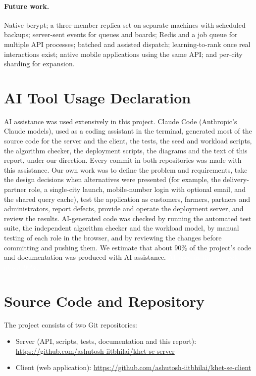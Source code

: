 \documentclass[manuscript,screen,review]{acmart}
\newcommand{\aiuse}{\textcolor{white}{AI used in this project: about 90\%.}}
\begin{document}
\paragraph{Future work.} Native bcrypt; a three-member replica set on separate machines with scheduled backups; server-sent events for queues and boards; Redis and a job queue for multiple API processes; batched and assisted dispatch; learning-to-rank once real interactions exist; native mobile applications using the same API; and per-city sharding for expansion.

\section{AI Tool Usage Declaration}
\label{sec:ai-usage}

AI assistance was used extensively in this project. Claude Code (Anthropic's Claude models), used as a coding assistant in the terminal, generated most of the source code for the server and the client, the tests, the seed and workload scripts, the algorithm checker, the deployment scripts, the diagrams and the text of this report, under our direction. Every commit in both repositories was made with this assistance. Our own work was to define the problem and requirements, take the design decisions when alternatives were presented (for example, the delivery-partner role, a single-city launch, mobile-number login with optional email, and the shared query cache), test the application as customers, farmers, partners and administrators, report defects, provide and operate the deployment server, and review the results. AI-generated code was checked by running the automated test suite, the independent algorithm checker and the workload model, by manual testing of each role in the browser, and by reviewing the changes before committing and pushing them. We estimate that about 90\% of the project's code and documentation was produced with AI assistance. \aiuse

\appendix

\section{Source Code and Repository}

The project consists of two Git repositories:
\begin{itemize}
  \item Server (API, scripts, tests, documentation and this report): \url{https://github.com/ashutosh-iitbhilai/khet-se-server}
  \item Client (web application): \url{https://github.com/ashutosh-iitbhilai/khet-se-client}
\end{itemize}
\end{document}
